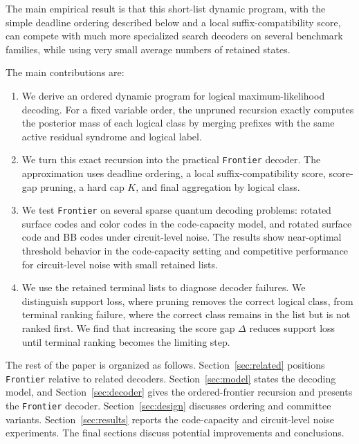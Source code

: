 \documentclass[a4paper,twocolumn,11pt,unpublished]{quantumarticle}
\newcommand{\frontier}{\texttt{Frontier}}
\begin{document}
The main empirical result is that this short-list dynamic program, with the simple deadline ordering described below and a local suffix-compatibility score, can compete with much more specialized search decoders on several benchmark families, while using very small average numbers of retained states.

The main contributions are:
\begin{enumerate}[leftmargin=*]
\item We derive an ordered dynamic program for logical maximum-likelihood decoding. For a fixed variable order, the unpruned recursion exactly computes the posterior mass of each logical class by merging prefixes with the same active residual syndrome and logical label.

\item We turn this exact recursion into the practical \frontier{} decoder. The approximation uses deadline ordering, a local suffix-compatibility score, score-gap pruning, a hard cap \(K\), and final aggregation by logical class.

\item We test \frontier{} on several sparse quantum decoding problems: rotated surface codes and color codes in the code-capacity model, and rotated surface code and BB codes under circuit-level noise. The results show near-optimal threshold behavior in the code-capacity setting and competitive performance for circuit-level noise with small retained lists.

\item We use the retained terminal lists to diagnose decoder failures. We distinguish support loss, where pruning removes the correct logical class, from terminal ranking failure, where the correct class remains in the list but is not ranked first. We find that increasing the score gap \(\Delta\) reduces support loss until terminal ranking becomes the limiting step.
\end{enumerate}

The rest of the paper is organized as follows.  Section~\ref{sec:related} positions \frontier{} relative to related decoders.  Section~\ref{sec:model} states the decoding model, and Section~\ref{sec:decoder} gives the ordered-frontier recursion and presents the \frontier{} decoder.  Section~\ref{sec:design} discusses ordering and committee variants.  Section~\ref{sec:results} reports the code-capacity and circuit-level noise experiments. The final sections discuss potential improvements and conclusions.
\end{document}
